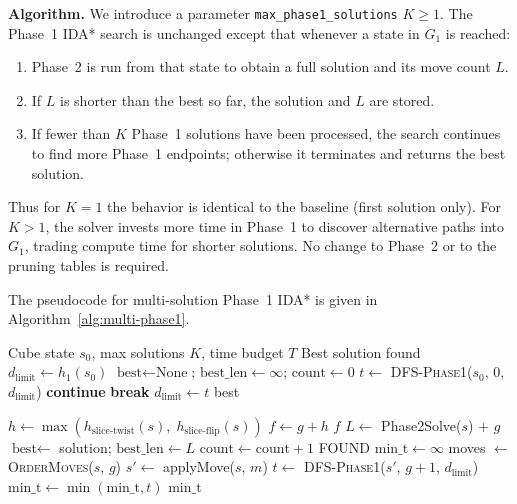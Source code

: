 \documentclass[10pt,twocolumn,a4paper]{article}
\begin{document}
\textbf{Algorithm.} We introduce a parameter \texttt{max\_phase1\_solutions} $K \geq 1$. The Phase~1 IDA* search is unchanged except that whenever a state in $G_1$ is reached:
\begin{enumerate}
  \item Phase~2 is run from that state to obtain a full solution and its move count $L$.
  \item If $L$ is shorter than the best so far, the solution and $L$ are stored.
  \item If fewer than $K$ Phase~1 solutions have been processed, the search continues to find more Phase~1 endpoints; otherwise it terminates and returns the best solution.
\end{enumerate}
Thus for $K=1$ the behavior is identical to the baseline (first solution only). For $K>1$, the solver invests more time in Phase~1 to discover alternative paths into $G_1$, trading compute time for shorter solutions. No change to Phase~2 or to the pruning tables is required.

The pseudocode for multi-solution Phase~1 IDA* is given in Algorithm~\ref{alg:multi-phase1}.

\begin{algorithm}[t]
\caption{Multi-Solution Phase~1 IDA*}
\label{alg:multi-phase1}
\begin{algorithmic}[1]
\REQUIRE Cube state $s_0$, max solutions $K$, time budget $T$
\ENSURE Best solution found
\STATE $d_{\text{limit}} \gets h_1(s_0)$
\STATE $\text{best} \gets \text{None}$; $\text{best\_len} \gets \infty$; $\text{count} \gets 0$
  \STATE $t \gets$ \textsc{DFS-Phase1}($s_0$, $0$, $d_{\text{limit}}$)
    \STATE \textbf{continue} 
  \ENDIF
    \STATE \textbf{break} 
  \ENDIF
  \STATE $d_{\text{limit}} \gets t$ 
\ENDWHILE
\RETURN best
\end{algorithmic}
\end{algorithm}

\begin{algorithm}[t]
\caption{\textsc{DFS-Phase1}($s$, $g$, $d_{\text{limit}}$)}
\label{alg:dfs-phase1}
\begin{algorithmic}[1]
\STATE $h \gets \max(h_{\text{slice-twist}}(s),\; h_{\text{slice-flip}}(s))$
\STATE $f \gets g + h$
  \RETURN $f$ 
\ENDIF
{} 
  \STATE $L \gets$ Phase2Solve($s$) + $g$
    \STATE $\text{best} \gets$ solution; $\text{best\_len} \gets L$
  \ENDIF
  \STATE $\text{count} \gets \text{count} + 1$
  \RETURN FOUND
\ENDIF
\STATE $\text{min\_t} \gets \infty$
\STATE moves $\gets$ \textsc{OrderMoves}($s$, $g$) 
  \STATE $s' \gets$ applyMove($s$, $m$)
  \STATE $t \gets$ \textsc{DFS-Phase1}($s'$, $g{+}1$, $d_{\text{limit}}$)
  \STATE $\text{min\_t} \gets \min(\text{min\_t}, t)$
\ENDFOR
\RETURN $\text{min\_t}$
\end{algorithmic}
\end{algorithm}
\end{document}
